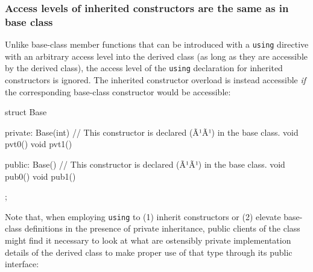 \subsubsection[Access levels of inherited constructors are the same as in base class]{Access levels of inherited constructors are the same as in base class}\label{access-levels-of-inherited-constructors-are-same-as-in-base-class}

Unlike base-class member functions that can be introduced with a
\lstinline!using! directive with an arbitrary access level into the derived
class (as long as they are accessible by the derived class), the access
level of the \lstinline!using! declaration for inherited constructors is
ignored. The inherited constructor overload is instead
accessible \emph{if} the corresponding base-class constructor would be
accessible:

\begin{emcppslisting}[language=C++]
struct Base
{
private:
    Base(int) { }  // This constructor is declared (Ã¹{}Ã¹) in the base class.
    void pvt0() { }
    void pvt1() { }

public:
    Base() { }     // This constructor is declared (Ã¹{}Ã¹) in the base class.
    void pub0() { }
    void pub1() { }
};
\end{emcppslisting}
    
\noindent Note that, when employing \lstinline!using! to (1) inherit constructors or
(2) elevate base-class definitions in the presence of private
inheritance, public clients of the class might find it necessary 
to look at what are ostensibly private implementation details of the
derived class to make proper use of that type through its
public interface:

